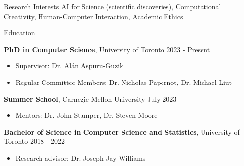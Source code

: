 \documentclass{resume} %
\begin{document}
\begin{rSection}{Research Interests}
    AI for Science (scientific discoveries), Computational Creativity, Human-Computer Interaction, Academic Ethics
\end{rSection}
\begin{rSection}{Education}

    \textbf{PhD in Computer Science}, University of Toronto \hfill {2023 - Present}
    \begin{itemize}
        \item Supervisor: Dr. Alán Aspuru-Guzik
        \item Regular Committee Members: Dr. Nicholas Papernot, Dr. Michael Liut
    \end{itemize}
    
    \textbf{Summer School}, Carnegie Mellon University \hfill {July 2023}
    \begin{itemize}
        \item Mentors: Dr. John Stamper, Dr. Steven Moore
    \end{itemize}
    
    \textbf{Bachelor of Science in Computer Science and Statistics}, University of Toronto \hfill {2018 - 2022}
    \begin{itemize}
        \item Research advisor: Dr. Joseph Jay Williams
    \end{itemize}

\end{rSection}
\end{document}
